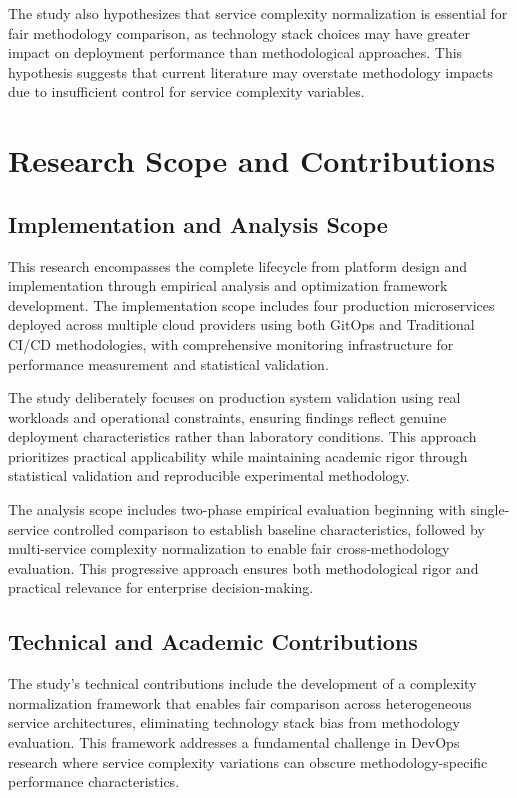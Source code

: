 The study also hypothesizes that service complexity normalization is essential for fair methodology comparison, as technology stack choices may have greater impact on deployment performance than methodological approaches. This hypothesis suggests that current literature may overstate methodology impacts due to insufficient control for service complexity variables.

\section{Research Scope and Contributions}

\subsection{Implementation and Analysis Scope}
This research encompasses the complete lifecycle from platform design and implementation through empirical analysis and optimization framework development. The implementation scope includes four production microservices deployed across multiple cloud providers using both GitOps and Traditional CI/CD methodologies, with comprehensive monitoring infrastructure for performance measurement and statistical validation.

The study deliberately focuses on production system validation using real workloads and operational constraints, ensuring findings reflect genuine deployment characteristics rather than laboratory conditions. This approach prioritizes practical applicability while maintaining academic rigor through statistical validation and reproducible experimental methodology.

The analysis scope includes two-phase empirical evaluation beginning with single-service controlled comparison to establish baseline characteristics, followed by multi-service complexity normalization to enable fair cross-methodology evaluation. This progressive approach ensures both methodological rigor and practical relevance for enterprise decision-making.

\subsection{Technical and Academic Contributions}
The study's technical contributions include the development of a complexity normalization framework that enables fair comparison across heterogeneous service architectures, eliminating technology stack bias from methodology evaluation. This framework addresses a fundamental challenge in DevOps research where service complexity variations can obscure methodology-specific performance characteristics.

